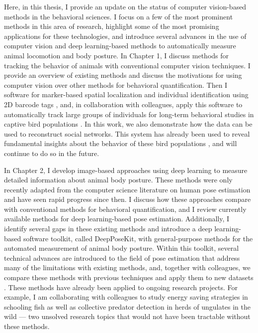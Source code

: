 Here, in this thesis, I provide an update on the status of computer vision-based methods in the behavioral sciences. I focus on a few of the most prominent methods in this area of research, highlight some of the most promising applications for these technologies, and introduce several advances in the use of computer vision and deep learning-based methods to automatically measure animal locomotion and body posture. In Chapter 1, I discuss methods for tracking the behavior of animals with conventional computer vision techniques. I provide an overview of existing methods and discuss the motivations for using computer vision over other methods for behavioral quantification. Then I software for marker-based spatial localization and individual identification using 2D barcode tags \citep{graving2017pinpoint}, and, in collaboration with colleagues, apply this software to automatically track large groups of individuals for long-term behavioral studies in captive bird populations \citep{alarcon2018automated}. In this work, we also demonstrate how the data can be used to reconstruct social networks. This system has already been used to reveal fundamental insights about the behavior of these bird populations \citep{maldonado2018experimental}, and will continue to do so in the future. 

In Chapter 2, I develop image-based approaches using deep learning to measure detailed information about animal body posture. These methods were only recently adapted from the computer science literature on human pose estimation and have seen rapid progress since then. I discuss how these approaches compare with conventional methods for behavioral quantification, and I review currently available methods for deep learning-based pose estimation. Additionally, I identify several gaps in these existing methods and introduce a deep learning-based software toolkit, called DeepPoseKit, with general-purpose methods for the automated measurement of animal body posture. Within this toolkit, several technical advances are introduced to the field of pose estimation that address many of the limitations with existing methods, and, together with colleagues, we compare these methods with previous techniques and apply them to new datasets \citep{graving2019deepposekit}. These methods have already been applied to ongoing research projects. For example, I am collaborating with colleagues to study energy saving strategies in schooling fish as well as collective predator detection in herds of ungulates in the wild --- two unsolved research topics that would not have been tractable without these methods.

